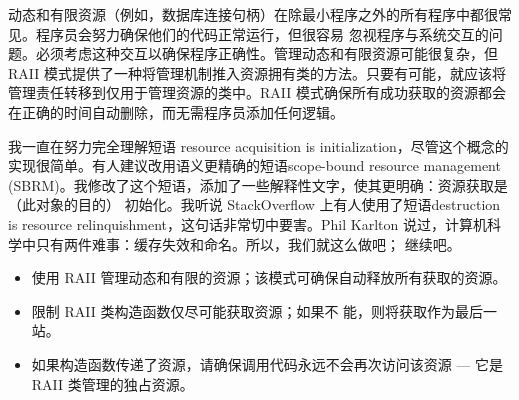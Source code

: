 动态和有限资源（例如，数据库连接句柄）在除最小程序之外的所有程序中都很常见。程序员会努力确保他们的代码正常运行，但很容易 忽视程序与系统交互的问题。必须考虑这种交互以确保程序正确性。管理动态和有限资源可能很复杂，但 RAII 模式提供了一种将管理机制推入资源拥有类的方法。只要有可能，就应该将管理责任转移到仅用于管理资源的类中。RAII 模式确保所有成功获取的资源都会在正确的时间自动删除，而无需程序员添加任何逻辑。

我一直在努力完全理解短语 resource acquisition is initialization，尽管这个概念的实现很简单。有人建议改用语义更精确的短语scope-bound resource management (SBRM)。我修改了这个短语，添加了一些解释性文字，使其更明确：资源获取是（此对象的目的） 初始化。我听说 StackOverflow 上有人使用了短语destruction is resource relinquishment，这句话非常切中要害。Phil Karlton 说过，计算机科学中只有两件难事：缓存失效和命名。所以，我们就这么做吧； 继续吧。


\begin{itemize}
\item
使用 RAII 管理动态和有限的资源；该模式可确保自动释放所有获取的资源。

\item
限制 RAII 类构造函数仅尽可能获取资源；如果不 能，则将获取作为最后一站。

\item
如果构造函数传递了资源，请确保调用代码永远不会再次访问该资源 — 它是 RAII 类管理的独占资源。
\end{itemize}





